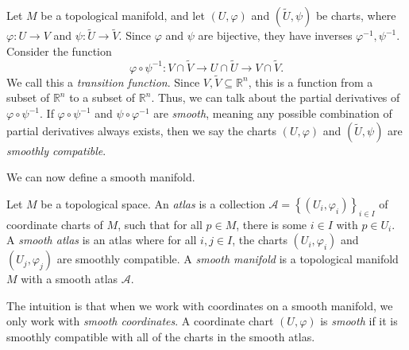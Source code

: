 \begin{definition}\label{dfn:1-5}
	Let $M$ be a topological manifold, and let $(U,\varphi )$ and $(\widetilde{U}, \psi)$ be charts, where $\varphi : U \to V$ and $\psi: \widetilde{U} \to \widetilde{V} $. Since $\varphi $ and $\psi $ are bijective, they have inverses $\varphi ^{-1} ,\psi ^{-1} $. Consider the function
	\[
		\varphi \circ \psi ^{-1} : V \cap \widetilde{V}  \to U \cap \widetilde{U} \to V \cap \widetilde{V} 
	.\]
	We call this a \emph{transition function}. Since $V,\widetilde{V} \subseteq \mathbb{R} ^n$, this is a function from a subset of $\mathbb{R} ^n$ to a subset of $\mathbb{R} ^n$. Thus, we can talk about the partial derivatives of $\varphi \circ \psi ^{-1} $. If $\varphi \circ \psi ^{-1} $ and $\psi \circ \varphi ^{-1} $ are \emph{smooth}, meaning any possible combination of partial derivatives always exists, then we say the charts $(U,\varphi )$ and $(\widetilde{U} ,\psi )$ are \emph{smoothly compatible}.
\end{definition}

We can now define a smooth manifold.

\begin{definition}\label{dfn:1-6}
	Let $M$ be a topological space. An \emph{atlas} is a collection $\mathcal{A} =\left\{ (U_i, \varphi _i) \right\}_{i\in I} $ of coordinate charts of $M$, such that for all $p\in M$, there is some $i\in I$ with $p\in U_i$. A \emph{smooth atlas} is an atlas where for all $i,j\in I$, the charts $(U_i,\varphi _i)$ and $(U_j,\varphi _j)$ are smoothly compatible. A \emph{smooth manifold} is a topological manifold $M$ with a smooth atlas $\mathcal{A} $.
\end{definition}

The intuition is that when we work with coordinates on a smooth manifold, we only work with \emph{smooth coordinates}. A coordinate chart $(U,\varphi )$ is \emph{smooth} if it is smoothly compatible with all of the charts in the smooth atlas.


